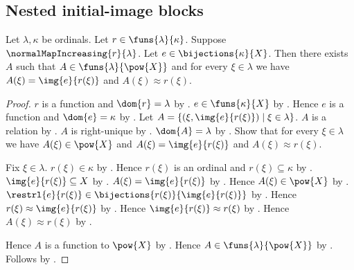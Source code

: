\subsection{Nested initial-image blocks}

\begin{theorem}\label{increasing_initial_image_family}
    Let $\lambda,\kappa$ be ordinals.
    Let $r\in\funs{\lambda}{\kappa}$.
    Suppose $\normalMapIncreasing{r}{\lambda}$.
    Let $e\in\bijections{\kappa}{X}$.
    Then there exists $A$ such that
        $A\in\funs{\lambda}{\pow{X}}$ and
        for every $\xi\in\lambda$ we have
            $A(\xi)=\img{e}{r(\xi)}$ and $A(\xi)\approx r(\xi)$.
\end{theorem}
\begin{proof}
    $r$ is a function and $\dom{r}=\lambda$ by
        .
    $e\in\funs{\kappa}{X}$ by .
    Hence $e$ is a function and $\dom{e}=\kappa$ by
        .
    Let $A=\{(\xi,\img{e}{r(\xi)})\mid\xi\in\lambda\}$.
    $A$ is a relation by .
    $A$ is right-unique by .
    $\dom{A}=\lambda$ by .
    Show that for every $\xi\in\lambda$ we have
        $A(\xi)\in\pow{X}$ and $A(\xi)=\img{e}{r(\xi)}$ and
        $A(\xi)\approx r(\xi)$.
    \begin{subproof}
        Fix $\xi\in\lambda$.
        $r(\xi)\in\kappa$ by .
        Hence $r(\xi)$ is an ordinal and $r(\xi)\subseteq\kappa$ by
            .
        $\img{e}{r(\xi)}\subseteq X$ by
            .
        $A(\xi)=\img{e}{r(\xi)}$ by
            .
        Hence $A(\xi)\in\pow{X}$ by .
        $\restrl{e}{r(\xi)}\in
            \bijections{r(\xi)}{\img{e}{r(\xi)}}$ by
            .
        Hence $r(\xi)\approx\img{e}{r(\xi)}$ by .
        Hence $\img{e}{r(\xi)}\approx r(\xi)$ by .
        Hence $A(\xi)\approx r(\xi)$ by \auto.
    \end{subproof}
    Hence $A$ is a function to $\pow{X}$ by \auto.
    Hence $A\in\funs{\lambda}{\pow{X}}$ by .
    Follows by \auto.
\end{proof}

